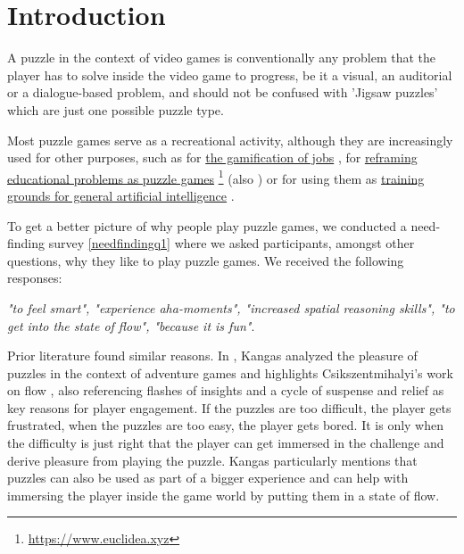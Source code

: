 
\setcounter{chapter}{0}

\chapter{Introduction}
A puzzle in the context of video games is conventionally any problem that the player has to solve inside the video game to progress, be it a visual, an auditorial or a dialogue-based problem, and should not be confused with 'Jigsaw puzzles' which are just one possible puzzle type.

Most puzzle games serve as a recreational activity, although they are increasingly used for other purposes, such as for \href{https://www.theguardian.com/technology/2014/jan/25/online-gamers-solving-sciences-biggest-problems}{the gamification of jobs} \cite{TheGuardian}, for \href{https://www.euclidea.xyz}{reframing educational problems as puzzle games} \footnote{\url{https://www.euclidea.xyz}} (also \cite{Lee2014}) or for using them as \href{http://www.gvgai.net}{training grounds for general artificial intelligence} \cite{Perez2014}.

To get a better picture of why people play puzzle games, we conducted a need-finding survey \ref{needfindingq1} where we asked participants, amongst other questions, why they like to play puzzle games. We received the following responses:

\textit{ "to feel smart", "experience aha-moments", "increased spatial reasoning skills", "to get into the state of flow", "because it is fun"}.

Prior literature found similar reasons. In \cite{Kangas2017}, Kangas analyzed the pleasure of puzzles in the context of adventure games and highlights Csikszentmihalyi's work on flow \cite{Csikszentmihalyi}, also referencing flashes of insights and a cycle of suspense and relief as key reasons for player engagement. If the puzzles are too difficult, the player gets frustrated, when the puzzles are too easy, the player gets bored. It is only when the difficulty is just right that the player can get immersed in the challenge and derive pleasure from playing the puzzle. Kangas particularly mentions that puzzles can also be used as part of a bigger experience and can help with immersing the player inside the game world by putting them in a state of flow.



